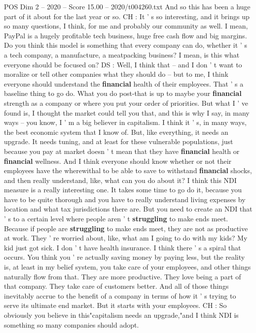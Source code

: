 \begin{textsample}{POS Dim 2 – 2020 – Score 15.00 – 2020/t004260.txt}
And so this has been a huge part of it about for the last year or so.
CH : It ' s so interesting, and it brings up so many questions, I think, for me and probably our community as well.
I mean, PayPal is a hugely profitable tech business, huge free cash flow and big margins.
Do you think this model is something that every company can do, whether it ' s a tech company, a manufacture, a meatpacking business?
I mean, is this what everyone should be focused on?
DS : Well, I think that -- and I don ' t want to moralize or tell other companies what they should do -- but to me, I think everyone should understand the \textbf{financial} health of their employees.
That ' s a baseline thing to go do.
What you do post-that is up to maybe your \textbf{financial} strength as a company or where you put your order of priorities.
But what I ' ve found is, I thought the market could tell you that, and this is why I say, in many ways -- you know, I ' m a big believer in capitalism.
I think it ' s, in many ways, the best economic system that I know of.
But, like everything, it needs an upgrade.
It needs tuning, and at least for these vulnerable populations, just because you pay at market doesn ' t mean that they have \textbf{financial} health or \textbf{financial} wellness.
And I think everyone should know whether or not their employees have the wherewithal to be able to save to withstand \textbf{financial} shocks, and then really understand, like, what can you do about it?
I think this NDI measure is a really interesting one.
It takes some time to go do it, because you have to be quite thorough and you have to really understand living expenses by location and what tax jurisdictions there are.
But you need to create an NDI that ' s to a certain level where people aren ' t \textbf{struggling} to make ends meet.
Because if people are \textbf{struggling} to make ends meet, they are not as productive at work.
They ' re worried about, like, what am I going to do with my kids?
My kid just got sick.
I don ' t have health insurance.
I think there ' s a spiral that occurs.
You think you ' re actually saving money by paying less, but the reality is, at least in my belief system, you take care of your employees, and other things naturally flow from that.
They are more productive.
They love being a part of that company.
They take care of customers better.
And all of those things inevitably accrue to the benefit of a company in terms of how it ' s trying to serve its ultimate end market.
But it starts with your employees.
CH : So obviously you believe in this"capitalism needs an upgrade,"and I think NDI is something so many companies should adopt.

\end{textsample}
